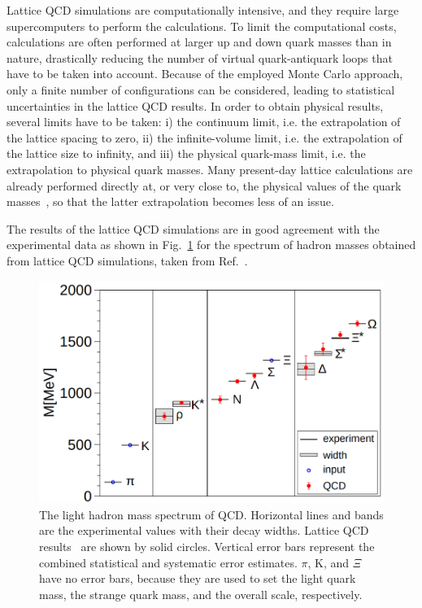 Lattice QCD simulations are computationally intensive, and they require large supercomputers to perform the calculations. To limit the computational costs, calculations are often performed at larger up and down quark masses than in nature, drastically reducing the number of virtual quark-antiquark loops that have to be taken into account. Because of the employed Monte Carlo approach, only a finite number of configurations can be considered, leading to statistical uncertainties in the lattice QCD results. In order to obtain physical results, several limits have to be taken: i) the continuum limit, i.e. the extrapolation of the lattice spacing to zero, ii) the infinite-volume limit, i.e. the extrapolation of the lattice size to infinity, and iii) the physical quark-mass limit, i.e. the extrapolation to physical quark masses. Many present-day lattice calculations are already performed directly at, or very close to, the physical values of the quark masses~\cite{BMW:2008jgk,BMW:2014pzb,Bazavov:2017dus}, so that the latter extrapolation becomes less of an issue. 

The results of the lattice QCD simulations are in good agreement with the experimental data as shown in Fig.~\ref{fig:LQCD_hadron_mass} for the spectrum of hadron masses obtained from lattice QCD simulations, taken from Ref.~\cite{BMW:2008jgk}.
\begin{figure}[t!]
  \centering
  \includegraphics[width=0.7\linewidth]{Figures/Chapter 1/LQCD_hadron_mass.png}
  \caption{The light hadron mass spectrum of QCD. Horizontal lines and bands are the experimental values with their decay widths. Lattice QCD results~\cite{BMW:2008jgk} are shown by solid circles. Vertical error bars represent the combined statistical and systematic error estimates. $\pi$, K, and $\Xi$ have no error bars, because they are used to set the light quark mass, the strange quark mass, and the overall scale, respectively.}
  \label{fig:LQCD_hadron_mass}
\end{figure}

